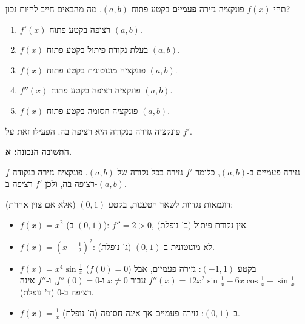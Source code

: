 
\begin{question}
תהי $f(x)$ פונקציה גזירה \textbf{פעמיים} בקטע פתוח $(a,b)$. מה מהבאים חייב להיות נכון?
\begin{enumerate}
  \item $f'(x)$ רציפה בקטע פתוח $(a,b)$.
  \item $f(x)$ בעלת נקודת פיתול בקטע פתוח $(a,b)$.
  \item $f(x)$ פונקציה מונוטונית בקטע פתוח $(a,b)$.
  \item $f''(x)$ פונקציה רציפה בקטע פתוח $(a,b)$.
  \item $f(x)$ פונקציה חסומה בקטע פתוח $(a,b)$.
\end{enumerate}
\end{question}

\begin{hint}
פונקציה גזירה בנקודה היא רציפה בה. הפעילו זאת על $f'$.
\end{hint}

\begin{solution}
\textbf{התשובה הנכונה: א.}

$f$ גזירה פעמיים ב-$(a,b)$, כלומר $f'$ גזירה בכל נקודה של $(a,b)$. פונקציה גזירה בנקודה רציפה בה, ולכן $f'$ רציפה ב-$(a,b)$.

דוגמאות נגדיות לשאר הטענות, בקטע $(0,1)$ (אלא אם צוין אחרת):
\begin{itemize}
  \item $f(x)=x^2$ (ב-$(0,1)$): $f''=2>0$, אין נקודת פיתול (ב' נופלת).
  \item $f(x)=\left(x-\frac12\right)^2$: לא מונוטונית ב-$(0,1)$ (ג' נופלת).
  \item $f(x)=x^4\sin\frac1x$ ($f(0)=0$) בקטע $(-1,1)$: גזירה פעמיים, אבל $f''(x)=12x^2\sin\frac1x-6x\cos\frac1x-\sin\frac1x$ עבור $x\neq0$ ו-$f''(0)=0$, ו-$f''$ אינה רציפה ב-$0$ (ד' נופלת).
  \item $f(x)=\frac1x$ ב-$(0,1)$: גזירה פעמיים אך אינה חסומה (ה' נופלת).
\end{itemize}
\end{solution}
